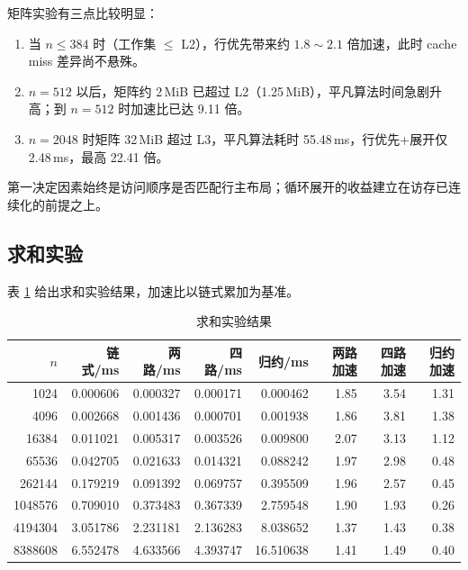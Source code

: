 \documentclass[a4paper,11pt,UTF8]{ctexart}
\begin{document}
矩阵实验有三点比较明显：
\begin{enumerate}
  \item 当 $n \leq 384$ 时（工作集 $\leq$ L2），行优先带来约 $1.8 \sim 2.1$ 倍加速，此时 cache miss 差异尚不悬殊。
  \item $n=512$ 以后，矩阵约 2\,MiB 已超过 L2（1.25\,MiB），平凡算法时间急剧升高；到 $n=512$ 时加速比已达 9.11 倍。
  \item $n=2048$ 时矩阵 32\,MiB 超过 L3，平凡算法耗时 55.48\,ms，行优先+展开仅 2.48\,ms，最高 22.41 倍。
\end{enumerate}

第一决定因素始终是访问顺序是否匹配行主布局；循环展开的收益建立在访存已连续化的前提之上。

\subsection{求和实验}
表 \ref{tab:sum} 给出求和实验结果，加速比以链式累加为基准。

\begin{table}[H]
  \centering\scriptsize
  \begin{tabular}{rrrrrrrr}
    \toprule
    $n$ & 链式/ms & 两路/ms & 四路/ms & 归约/ms & 两路加速 & 四路加速 & 归约加速 \\
    \midrule
    1024      & 0.000606 & 0.000327 & 0.000171 & 0.000462 & 1.85 & 3.54 & 1.31 \\
    4096      & 0.002668 & 0.001436 & 0.000701 & 0.001938 & 1.86 & 3.81 & 1.38 \\
    16384     & 0.011021 & 0.005317 & 0.003526 & 0.009800 & 2.07 & 3.13 & 1.12 \\
    65536     & 0.042705 & 0.021633 & 0.014321 & 0.088242 & 1.97 & 2.98 & 0.48 \\
    262144    & 0.179219 & 0.091392 & 0.069757 & 0.395509 & 1.96 & 2.57 & 0.45 \\
    1048576   & 0.709010 & 0.373483 & 0.367339 & 2.759548 & 1.90 & 1.93 & 0.26 \\
    4194304   & 3.051786 & 2.231181 & 2.136283 & 8.038652 & 1.37 & 1.43 & 0.38 \\
    8388608   & 6.552478 & 4.633566 & 4.393747 & 16.510638 & 1.41 & 1.49 & 0.40 \\
    \bottomrule
  \end{tabular}
  \caption{求和实验结果}
  \label{tab:sum}
\end{table}
\end{document}
